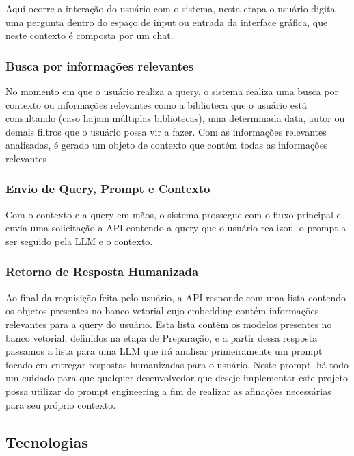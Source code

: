 \documentclass[a4paper, 12pt]{article}
\begin{document}
    Aqui ocorre a interação do usuário com o sistema, nesta etapa o usuário digita uma pergunta dentro do espaço de input ou entrada da interface gráfica, que neste contexto é composta por um chat.

    \subsubsection{Busca por informações relevantes}
    
    No momento em que o usuário realiza a query, o sistema realiza uma busca por contexto ou informações relevantes como a biblioteca que o usuário está consultando (caso hajam múltiplas bibliotecas), uma determinada data, autor ou demais filtros que o usuário possa vir a fazer. Com as informações relevantes analisadas, é gerado um objeto de contexto que contém todas as informações relevantes

    \subsubsection{Envio de Query, Prompt e Contexto}
    
    Com o contexto e a query em mãos, o sistema prossegue com o fluxo principal e envia uma solicitação a API contendo a query que o usuário realizou, o prompt a ser seguido pela LLM e o contexto.

    \subsubsection{Retorno de Resposta Humanizada}
    
    Ao final da requisição feita pelo usuário, a API responde com uma lista contendo os objetos presentes no banco vetorial cujo embedding contém informações relevantes para a query do usuário. Esta lista contém os modelos presentes no banco vetorial, definidos na etapa de Preparação, e a partir dessa resposta passamos a lista para uma LLM que irá analisar primeiramente um prompt focado em entregar respostas humanizadas para o usuário. Neste prompt, há todo um cuidado para que qualquer desenvolvedor que deseje implementar este projeto possa utilizar do prompt engineering a fim de realizar as afinações necessárias para seu próprio contexto.

    \subsection{Tecnologias}
\end{document}
